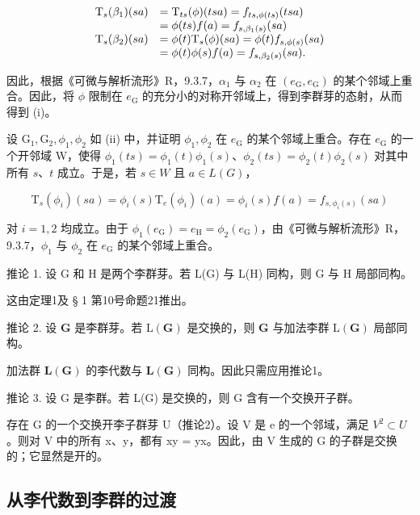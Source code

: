 \[
\begin{array}{r l} \mathrm{T} _ {s} (\beta_ {1}) (s a) & = \mathrm{T} _ {t s} (\phi) (t s a) = f _ {t s, \phi (t s)} (t s a) \\ & = \phi (t s) f (a) = f _ {s, \beta_ {1} (s)} (s a) \\ \mathrm{T} _ {s} (\beta_ {2}) (s a) & = \phi (t) \mathrm{T} _ {s} (\phi) (s a) = \phi (t) f _ {s, \phi (s)} (s a) \\ & = \phi (t) \phi (s) f (a) = f _ {s, \beta_ {2} (s)} (s a). \end{array}
\]

因此，根据《可微与解析流形》R，9.3.7，\(\alpha_{1}\) 与 \(\alpha_{2}\) 在 \((e_{\mathrm{G}}, e_{\mathrm{G}})\) 的某个邻域上重合。因此，将 \(\phi\) 限制在 \(e_{\mathrm{G}}\) 的充分小的对称开邻域上，得到李群芽的态射，从而得到 (i)。

设 \(\mathrm{G}_1, \mathrm{G}_2, \phi_1, \phi_2\) 如 (ii) 中，并证明 \(\phi_1, \phi_2\) 在 \(e_{\mathrm{G}}\) 的某个邻域上重合。存在 \(e_{\mathrm{G}}\) 的一个开邻域 W，使得 \(\phi_1(t s) = \phi_1(t)\phi_1(s)\)、\(\phi_2(t s) = \phi_2(t)\phi_2(s)\) 对其中所有 \(s\)、\(t\) 成立。于是，若 \(s \in W\) 且 \(a \in L(G)\)，

\[
\mathrm{T} _ {s} \left(\phi_ {i}\right) (s a) = \phi_ {i} (s) \mathrm{T} _ {e} \left(\phi_ {i}\right) (a) = \phi_ {i} (s) f (a) = f _ {s, \phi _ {i} (s)} (s a)
\]

对 \(i = 1,2\) 均成立。由于 \(\phi_1(e_{\mathrm{G}}) = e_{\mathrm{H}} = \phi_2(e_{\mathrm{G}})\)，由《可微与解析流形》R，9.3.7，\(\phi_1\) 与 \(\phi_2\) 在 \(e_{\mathrm{G}}\) 的某个邻域上重合。

推论 1. 设 G 和 H 是两个李群芽。若 L(G) 与 L(H) 同构，则 G 与 H 局部同构。

这由定理1及 § 1 第10号命题21推出。

推论 2. 设 \(\mathbf{G}\) 是李群芽。若 \(\mathrm{L}(\mathbf{G})\) 是交换的，则 \(\mathbf{G}\) 与加法李群 \(\mathrm{L}(\mathbf{G})\) 局部同构。

加法群 \(\mathbf{L}(\mathbf{G})\) 的李代数与 \(\mathbf{L}(\mathbf{G})\) 同构。因此只需应用推论1。

推论 3. 设 G 是李群。若 L(G) 是交换的，则 G 含有一个交换开子群。

存在 G 的一个交换开李子群芽 U（推论2）。设 V 是 e 的一个邻域，满足 \(V^{2} \subset U\)。则对 V 中的所有 x、y，都有 xy = yx。因此，由 V 生成的 G 的子群是交换的；它显然是开的。

\subsection{从李代数到李群的过渡}

